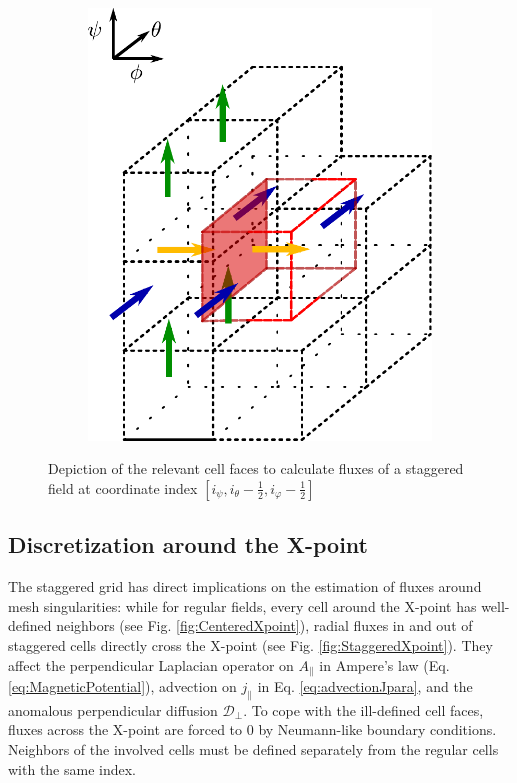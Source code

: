 \begin{figure}[H]
\begin{subfigure}[b]{0.24\textwidth}
		\includegraphics[width=1\textwidth]{schemes/BoundingBoxFluxPhiDiffPerp.pdf}
		\label{fig:StaggeredFluxPhi}
	\end{subfigure}
	
	\caption{Depiction of the relevant cell faces to calculate fluxes of a staggered field at coordinate index $[i_\psi, i_\theta-\frac{1}{2}, i_\varphi-\frac{1}{2}]$}
	\label{fig:StaggeredPerpendicularLaplancianCellSurfaces}
\end{figure}


\subsection{Discretization around the X-point}
\label{ssec:DiscretizationXPt}

The staggered grid has direct implications on the estimation of fluxes around mesh singularities: while for regular fields, every cell around the X-point has well-defined neighbors (see Fig. \ref{fig:CenteredXpoint}), radial fluxes in and out of staggered cells directly cross the X-point (see Fig. \ref{fig:StaggeredXpoint}). They affect the perpendicular Laplacian operator on $A_\parallel$ in Ampere's law (Eq. \ref{eq:MagneticPotential}), advection on $j_\parallel$ in Eq. \ref{eq:advectionJpara}, and the anomalous perpendicular diffusion $\mathcal{D}_\perp$. To cope with the ill-defined cell faces, fluxes across the X-point are forced to 0 by Neumann-like boundary conditions. Neighbors of the involved cells must be defined separately from the regular cells with the same index. \newline

